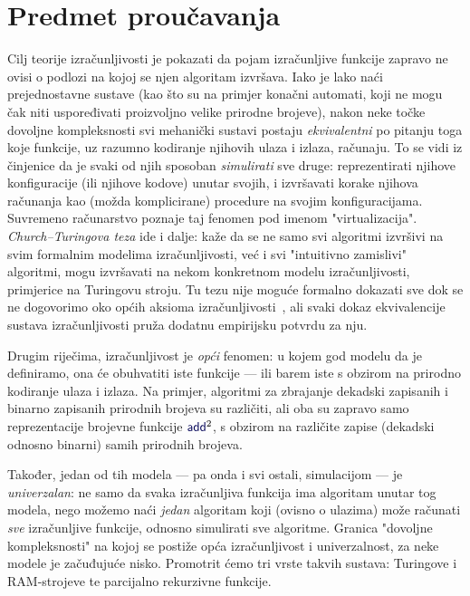 \section[]{Predmet proučavanja}

Cilj teorije izračunljivosti je pokazati da pojam izračunljive funkcije zapravo ne ovisi o podlozi na kojoj se njen algoritam izvršava. Iako je lako naći prejednostavne sustave (kao što su na primjer konačni automati, koji ne mogu čak niti uspoređivati proizvoljno velike prirodne brojeve), nakon neke točke dovoljne kompleksnosti svi mehanički sustavi postaju \emph{ekvivalentni} po pitanju toga koje funkcije, uz razumno kodiranje njihovih ulaza i izlaza, računaju. To se vidi iz činjenice da je svaki od njih sposoban \emph{simulirati} sve druge: reprezentirati njihove konfiguracije (ili njihove kodove) unutar svojih, i izvršavati korake njihova računanja kao (možda komplicirane) procedure na svojim konfiguracijama. Suvremeno računarstvo poznaje taj fenomen pod imenom "virtualizacija". \emph{Church--\!Turingova teza} ide i dalje: kaže da se ne samo svi algoritmi izvršivi na svim formalnim modelima izračunljivosti, već i svi "intuitivno zamislivi" algoritmi, mogu izvršavati na nekom konkretnom modelu izračunljivosti, primjerice na Turingovu stroju. Tu tezu nije moguće formalno dokazati sve dok se ne dogovorimo oko općih aksioma izračunljivosti~\cite{dershowitz}, ali svaki dokaz ekvivalencije sustava izračunljivosti pruža dodatnu empirijsku potvrdu za nju.

Drugim riječima, izračunljivost je \emph{opći} fenomen: u kojem god modelu da je definiramo, ona će obuhvatiti iste funkcije --- ili barem iste s obzirom na prirodno kodiranje ulaza i izlaza. Na primjer, algoritmi za zbrajanje dekadski zapisanih i binarno zapisanih prirodnih brojeva su različiti, ali oba su zapravo samo reprezentacije brojevne funkcije $\f{add}^2$, s obzirom na različite zapise (dekadski odnosno binarni) samih prirodnih brojeva.

Također, jedan od tih modela --- pa onda i svi ostali, simulacijom --- je \emph{univerzalan}: ne samo da svaka izračunljiva funkcija ima algoritam unutar tog modela, nego možemo naći \emph{jedan} algoritam koji (ovisno o ulazima) može računati \emph{sve} izračunljive funkcije, odnosno simulirati sve algoritme. Granica "dovoljne kompleksnosti" na kojoj se postiže opća izračunljivost i univerzalnost, za neke modele je začuđujuće nisko. Promotrit ćemo tri vrste takvih sustava: Turingove i RAM-strojeve te parcijalno rekurzivne funkcije.

